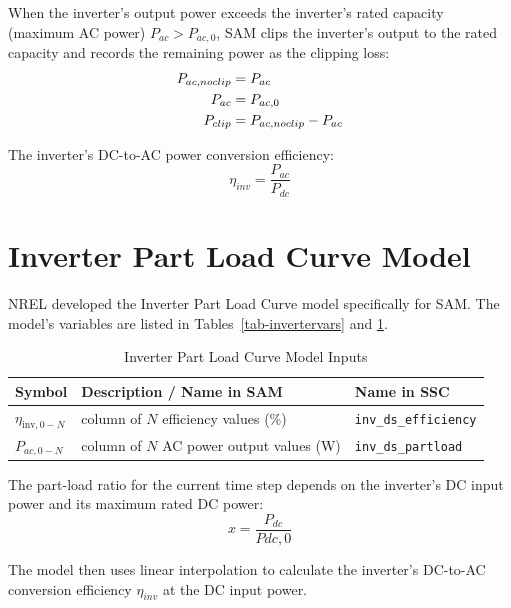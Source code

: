 \documentclass[12pt,letterpaper]{article}
\begin{document}
When the inverter's output power exceeds the inverter's rated capacity (maximum AC power) $P_{ac} > P_{ac,0}$, SAM clips the inverter's output to the rated capacity and records the remaining power as the clipping loss:
\begin{align}
P_{ac,noclip} &= P_{ac} \notag\\
P_{ac} &= P_{ac,0} \notag\\
P_{clip} &= P_{ac,noclip} - P_{ac}
\end{align}

The inverter's DC-to-AC power conversion efficiency:
\begin{equation}
\eta_{inv} = \frac{P_{ac}}{P_{dc}}
\end{equation}

\section{Inverter Part Load Curve Model}\label{sec-partloadinverter}

NREL developed the Inverter Part Load Curve model specifically for SAM. The model's variables are listed in Tables~\ref{tab-invertervars} and \ref{tab-partloadinvertervars}.

\begin{table}
\begin{center}
\caption{Inverter Part Load Curve Model Inputs}
\begin{tabular}{lll}
\midrule
Symbol & Description / \textbf{Name in SAM} & Name in SSC \\
\midrule
$\eta_{\mathrm{inv},0-N}$ & column of $N$ efficiency values (\%)& \texttt{inv\_ds\_efficiency} \\
$P_{ac,0-N}$ & column of $N$ AC power output values (W)& \texttt{inv\_ds\_partload} \\
\hline
\end{tabular}
\label{tab-partloadinvertervars}
\end{center}
\end{table}

The part-load ratio for the current time step depends on the inverter's DC input power and its maximum rated DC power:
\begin{equation}
x = \frac{P_{dc}}{P{dc,0}}
\end{equation}

The model then uses linear interpolation to calculate the inverter's DC-to-AC conversion efficiency $\eta_{inv}$ at the DC input power.
\end{document}
